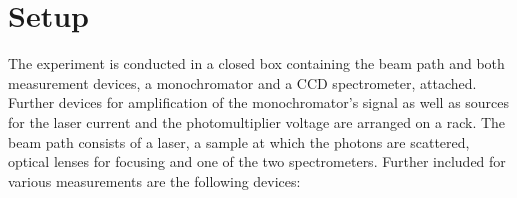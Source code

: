 \section{Setup}
The experiment is conducted in a closed box containing the beam path and both measurement devices, a monochromator and a 
CCD spectrometer, attached. Further devices for amplification of the monochromator's signal as well as sources for the 
laser current and the photomultiplier voltage are arranged on a rack. The beam path consists of a laser, a sample at which
the photons are scattered, optical lenses for focusing and one of the two spectrometers. Further included for various 
measurements are the following devices: 
